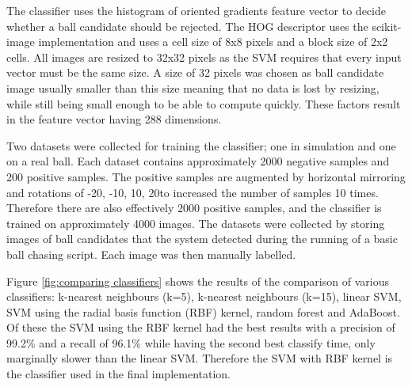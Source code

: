 The classifier uses the histogram of oriented gradients feature vector to decide whether a ball candidate should be rejected. The HOG descriptor uses the scikit-image implementation and uses a cell size of 8x8 pixels and a block size of 2x2 cells. All images are resized to 32x32 pixels as the SVM requires that every input vector must be the same size. A size of 32 pixels was chosen as ball candidate image usually smaller than this size meaning that no data is lost by resizing, while still being small enough to be able to compute quickly. These factors result in the feature vector having 288 dimensions.

Two datasets were collected for training the classifier; one in simulation and one on a real ball. Each dataset contains approximately 2000 negative samples and 200 positive samples. The positive samples are augmented by horizontal mirroring and rotations of -20\degree, -10\degree, 10\degree, 20\degree to increased the number of samples 10 times. Therefore there are also effectively 2000 positive samples, and the classifier is trained on approximately 4000 images. The datasets were collected by storing images of ball candidates that the system detected during the running of a basic ball chasing script. Each image was then manually labelled. 

Figure \ref{fig:comparing classifiers} shows the results of the comparison of various classifiers: k-nearest neighbours (k=5), k-nearest neighbours (k=15), linear SVM, SVM using the radial basis function (RBF) kernel, random forest and AdaBoost. Of these the SVM using the RBF kernel had the best results with a precision of 99.2\% and a recall of 96.1\% while having the second best classify time, only marginally slower than the linear SVM. Therefore the SVM with RBF kernel is the classifier used in the final implementation.

